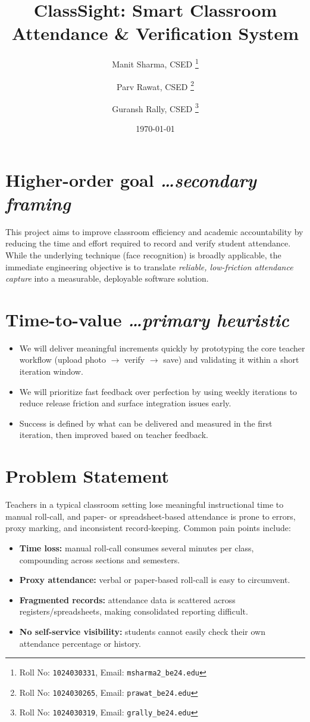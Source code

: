 \documentclass[11pt,a4paper]{article}
\title{ClassSight: Smart Classroom Attendance \& Verification System}
\author{
  Manit Sharma, CSED%
  \thanks{Roll No: \texttt{1024030331}, %
    Email: \texttt{msharma2\_be24\@thapar.edu}}
  \and 
  Parv Rawat, CSED%
  \thanks{Roll No: \texttt{1024030265}, %
    Email: \texttt{prawat\_be24\@thapar.edu}}
  \and 
  Guransh Rally, CSED%
  \thanks{Roll No: \texttt{1024030319}, %
    Email: \texttt{grally\_be24\@thapar.edu}}
}
\date{\today}
\newcommand{\BvrHint}[1]{%
  {\normalfont\normalsize\itshape\hfill #1}}
\begin{document}
\maketitle

\section{Higher-order goal%
  \BvrHint{\ldots secondary framing}}
This project aims to improve classroom efficiency and academic
accountability by reducing the time and effort required to record
and verify student attendance. While the underlying technique
(face recognition) is broadly applicable, the immediate engineering
objective is to translate \emph{reliable, low-friction attendance
  capture} into a measurable, deployable software solution.

\section{Time-to-value %
\BvrHint{\ldots primary heuristic}}
\begin{itemize}[leftmargin=0.7cm]
    \item We will deliver meaningful increments quickly by prototyping the core teacher workflow (upload photo $\rightarrow$ verify $\rightarrow$ save) and validating it within a short iteration window.
    \item We will prioritize fast feedback over perfection by using weekly iterations to reduce release friction and surface integration issues early.
    \item Success is defined by what can be delivered and measured in the first iteration, then improved based on teacher feedback.
\end{itemize}

\section{Problem Statement}
Teachers in a typical classroom setting lose meaningful instructional
time to manual roll-call, and paper- or spreadsheet-based attendance
is prone to errors, proxy marking, and inconsistent record-keeping.
Common pain points include:
\begin{itemize}[leftmargin=0.7cm]
    \item \textbf{Time loss:} manual roll-call consumes several minutes per class, compounding across sections and semesters.
    \item \textbf{Proxy attendance:} verbal or paper-based roll-call is easy to circumvent.
    \item \textbf{Fragmented records:} attendance data is scattered across registers/spreadsheets, making consolidated reporting difficult.
    \item \textbf{No self-service visibility:} students cannot easily check their own attendance percentage or history.
\end{itemize}
\end{document}
